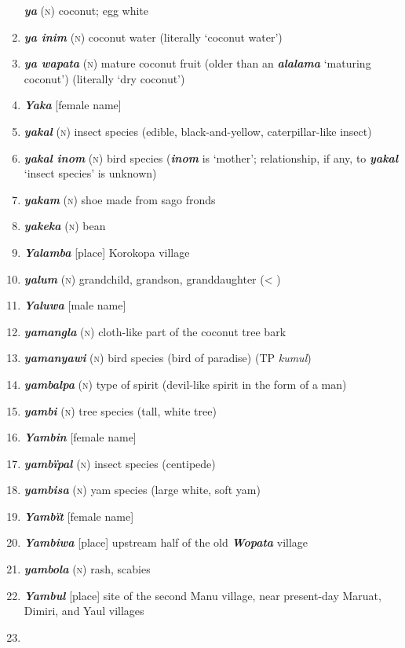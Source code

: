 \begin{enumerate}[noitemsep, label={}, align=left, widest=190, labelsep=1ex,leftmargin=*,itemindent=-10pt]
\textbf{\textit{ya}} (\textsc{n}) coconut; egg white \item 
\textbf{\textit{ya inim}} (\textsc{n}) coconut water (literally ‘coconut water’) \item 
\textbf{\textit{ya wapata}} (\textsc{n}) mature coconut fruit (older than an \textbf{\textit{alalama}} ‘maturing coconut’) (literally ‘dry coconut’) \item 
\textbf{\textit{Yaka}} [female name] \item 
\textbf{\textit{yakal}} (\textsc{n}) insect species (edible, black-and-yellow, caterpillar-like insect) \item 
\textbf{\textit{yakal inom}} (\textsc{n}) bird species (\textbf{\textit{inom}} is ‘mother’; relationship, if any, to \textbf{\textit{yakal}} ‘insect species’ is unknown) \item 
\textbf{\textit{yakam}} (\textsc{n}) shoe made from sago fronds \item 
\textbf{\textit{yakeka}} (\textsc{n}) bean \item 
\textbf{\textit{Yalamba}} [place] Korokopa village \item 
\textbf{\textit{yalum}} (\textsc{n}) grandchild, grandson, granddaughter (< ) \item 
\textbf{\textit{Yaluwa}} [male name] \item 
\textbf{\textit{yamangla}} (\textsc{n}) cloth-like part of the coconut tree bark \item 
\textbf{\textit{yamanyawi}} (\textsc{n}) bird species (bird of paradise) (TP \textit{kumul}) \item 
\textbf{\textit{yambalpa}} (\textsc{n}) type of spirit (devil-like spirit in the form of a man) \item 
\textbf{\textit{yambi}} (\textsc{n}) tree species (tall, white tree) \item 
\textbf{\textit{Yambin}} [female name] \item 
\textbf{\textit{yambïpal}} (\textsc{n}) insect species (centipede) \item 
\textbf{\textit{yambisa}} (\textsc{n}) yam species (large white, soft yam) \item 
\textbf{\textit{Yambït}} [female name] \item 
\textbf{\textit{Yambiwa}} [place] upstream half of the old \textbf{\textit{Wopata}} village \item 
\textbf{\textit{yambola}} (\textsc{n}) rash, scabies \item 
\textbf{\textit{Yambul}} [place] site of the second Manu village, near present-day Maruat, \linebreak Dimiri, and Yaul villages \item 

\end{enumerate}

